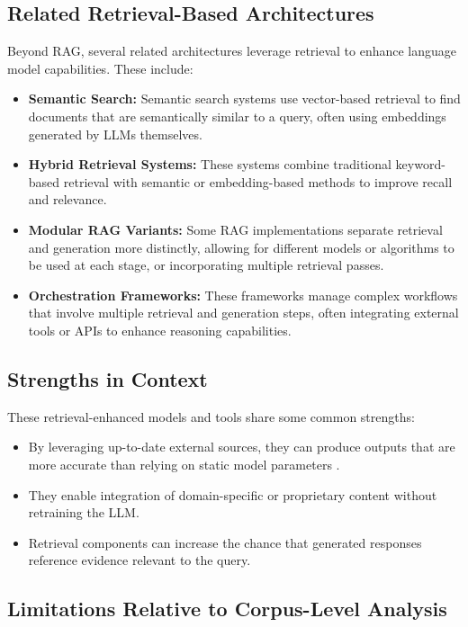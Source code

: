 \subsection{Related Retrieval-Based Architectures}

Beyond RAG, several related architectures leverage retrieval to enhance language model capabilities. These include:
\begin{itemize}
    \item \textbf{Semantic Search:} Semantic search systems use vector-based retrieval to find documents that are semantically similar to a query, often using embeddings generated by LLMs themselves.
    \item \textbf{Hybrid Retrieval Systems:} These systems combine traditional keyword-based retrieval with semantic or embedding-based methods to improve recall and relevance.
    \item \textbf{Modular RAG Variants:} Some RAG implementations separate retrieval and generation more distinctly, allowing for different models or algorithms to be used at each stage, or incorporating multiple retrieval passes.
    \item \textbf{Orchestration Frameworks:} These frameworks manage complex workflows that involve multiple retrieval and generation steps, often integrating external tools or APIs to enhance reasoning capabilities.
\end{itemize}

\subsection{Strengths in Context}

These retrieval-enhanced models and tools share some common strengths:

\begin{itemize}
    \item By leveraging up-to-date external sources, they can produce outputs that are more accurate than relying on static model parameters \cite{what_is_rag_ibm}.
    \item They enable integration of domain-specific or proprietary content without retraining the LLM.
    \item Retrieval components can increase the chance that generated responses reference evidence relevant to the query.
\end{itemize}

\subsection{Limitations Relative to Corpus-Level Analysis}

